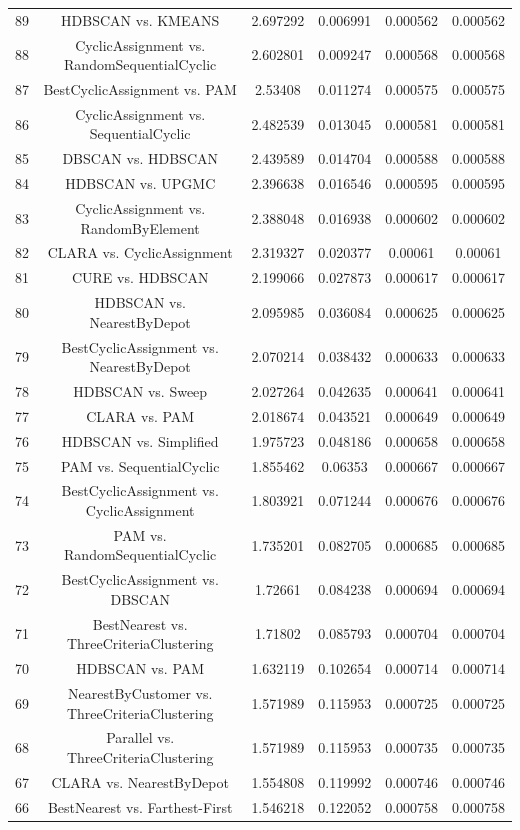 \documentclass[a4paper,10pt]{article}
\begin{document}
\begin{landscape}
\begin{table}[!htp]
\begin{tabular}{cccccc}
89&HDBSCAN vs. KMEANS&2.697292&0.006991&0.000562&0.000562\\
88&CyclicAssignment vs. RandomSequentialCyclic&2.602801&0.009247&0.000568&0.000568\\
87&BestCyclicAssignment vs. PAM&2.53408&0.011274&0.000575&0.000575\\
86&CyclicAssignment vs. SequentialCyclic&2.482539&0.013045&0.000581&0.000581\\
85&DBSCAN vs. HDBSCAN&2.439589&0.014704&0.000588&0.000588\\
84&HDBSCAN vs. UPGMC&2.396638&0.016546&0.000595&0.000595\\
83&CyclicAssignment vs. RandomByElement&2.388048&0.016938&0.000602&0.000602\\
82&CLARA vs. CyclicAssignment&2.319327&0.020377&0.00061&0.00061\\
81&CURE vs. HDBSCAN&2.199066&0.027873&0.000617&0.000617\\
80&HDBSCAN vs. NearestByDepot&2.095985&0.036084&0.000625&0.000625\\
79&BestCyclicAssignment vs. NearestByDepot&2.070214&0.038432&0.000633&0.000633\\
78&HDBSCAN vs. Sweep&2.027264&0.042635&0.000641&0.000641\\
77&CLARA vs. PAM&2.018674&0.043521&0.000649&0.000649\\
76&HDBSCAN vs. Simplified&1.975723&0.048186&0.000658&0.000658\\
75&PAM vs. SequentialCyclic&1.855462&0.06353&0.000667&0.000667\\
74&BestCyclicAssignment vs. CyclicAssignment&1.803921&0.071244&0.000676&0.000676\\
73&PAM vs. RandomSequentialCyclic&1.735201&0.082705&0.000685&0.000685\\
72&BestCyclicAssignment vs. DBSCAN&1.72661&0.084238&0.000694&0.000694\\
71&BestNearest vs. ThreeCriteriaClustering&1.71802&0.085793&0.000704&0.000704\\
70&HDBSCAN vs. PAM&1.632119&0.102654&0.000714&0.000714\\
69&NearestByCustomer vs. ThreeCriteriaClustering&1.571989&0.115953&0.000725&0.000725\\
68&Parallel vs. ThreeCriteriaClustering&1.571989&0.115953&0.000735&0.000735\\
67&CLARA vs. NearestByDepot&1.554808&0.119992&0.000746&0.000746\\
66&BestNearest vs. Farthest-First&1.546218&0.122052&0.000758&0.000758\\

\end{tabular}
\end{table}
\end{landscape}
\end{document}
